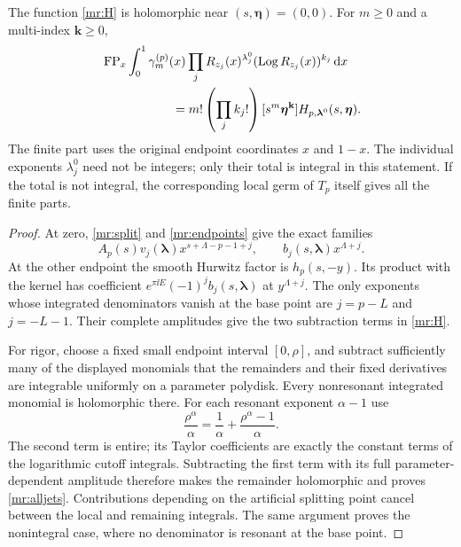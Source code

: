 \begin{theorem}
\label{mr:completion}
The function \eqref{mr:H} is holomorphic near $(s,\boldsymbol\eta)=(0,0)$.
For $m\ge0$ and a multi-index $\mathbf k\ge0$,
\begin{align}
 &\FP_x\int_0^1\gamma_m^{(p)}(x)
       \prod_j R_{z_j}(x)^{\lambda_j^0}
                       (\Log R_{z_j}(x))^{k_j}\dd x\notag\\
 &\hspace{20mm}=m!\left(\prod_j k_j!\right)
                    [s^m\boldsymbol\eta^{\mathbf k}]
                             H_{p,\boldsymbol\lambda^0}(s,\boldsymbol\eta).
       \label{mr:alljets}
\end{align}
The finite part uses the original endpoint coordinates $x$ and $1-x$.
The individual exponents $\lambda_j^0$ need not be integers; only
their total is integral in this statement. If the total is not integral,
the corresponding local germ of $T_p$ itself gives all the finite parts.
\end{theorem}

\begin{proof}
At zero, \eqref{mr:split} and \eqref{mr:endpoints} give the exact
families
\[
 A_p(s)v_j(\boldsymbol\lambda)x^{s+\Lambda-p-1+j},\qquad
 b_j(s,\boldsymbol\lambda)x^{\Lambda+j}.
\]
At the other endpoint the smooth Hurwitz factor is $h_p(s,-y)$.
Its product with the kernel has coefficient
$e^{\pi\ii E}(-1)^jb_j(s,\boldsymbol\lambda)$ at $y^{\Lambda+j}$.
The only exponents whose integrated denominators vanish at the base
point are $j=p-L$ and $j=-L-1$. Their complete amplitudes give the
two subtraction terms in \eqref{mr:H}.

For rigor, choose a fixed small endpoint interval $[0,\rho]$, and
subtract sufficiently many of the displayed monomials that the remainders
and their fixed derivatives are integrable uniformly on a parameter
polydisk. Every nonresonant integrated monomial is holomorphic there.
For each resonant exponent $\alpha-1$ use
\[
 \frac{\rho^\alpha}{\alpha}
             =\frac1\alpha+\frac{\rho^\alpha-1}{\alpha}.
\]
The second term is entire; its Taylor coefficients are exactly the
constant terms of the logarithmic cutoff integrals. Subtracting the
first term with its full parameter-dependent amplitude therefore makes
the remainder holomorphic and proves \eqref{mr:alljets}. Contributions
depending on the artificial splitting point cancel between the local
and remaining integrals. The same argument proves the nonintegral case,
where no denominator is resonant at the base point.
\end{proof}

